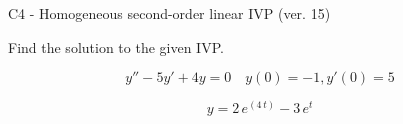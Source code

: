 \begin{exercise}
  \begin{exerciseTitle}C4 - Homogeneous second-order linear IVP (ver. 15)\end{exerciseTitle}
  \begin{exerciseStatement}
    
Find the solution to the given IVP.

    
\[y''-5y'+4y = 0 \hspace{1em} y(0) = -1 , y'(0) = 5\]

  \end{exerciseStatement}
  \begin{exerciseAnswer}
    
\[y= 2 \, e^{\left(4 \, t\right)} - 3 \, e^{t}\]

  \end{exerciseAnswer}
\end{exercise}